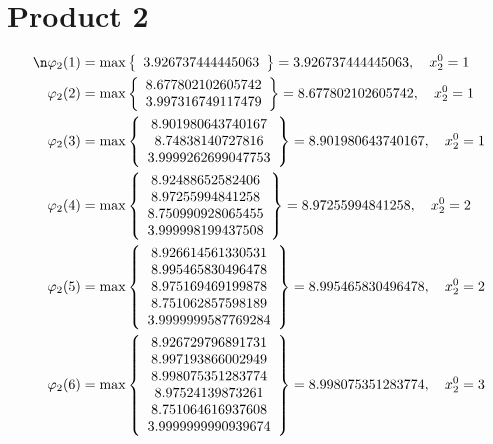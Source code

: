 \documentclass{article}
\begin{document}
\section{Product 2}
\begin{align*}
\n  
  
\varphi_{2}(1) &= \max \left\{ \begin{array}{c}
3.926737444445063
\end{array} \right\} = 3.926737444445063, \quad x_{2}^0 = 1\\
  
  
  
  
\varphi_{2}(2) &= \max \left\{ \begin{array}{c}
8.677802102605742 \\
 3.997316749117479
\end{array} \right\} = 8.677802102605742, \quad x_{2}^0 = 1\\
  
  
  
  
\varphi_{2}(3) &= \max \left\{ \begin{array}{c}
8.901980643740167 \\
 8.74838140727816 \\
 3.9999262699047753
\end{array} \right\} = 8.901980643740167, \quad x_{2}^0 = 1\\
  
  
  
  
\varphi_{2}(4) &= \max \left\{ \begin{array}{c}
8.92488652582406 \\
 8.97255994841258 \\
 8.750990928065455 \\
 3.999998199437508
\end{array} \right\} = 8.97255994841258, \quad x_{2}^0 = 2\\
  
  
  
  
\varphi_{2}(5) &= \max \left\{ \begin{array}{c}
8.926614561330531 \\
 8.995465830496478 \\
 8.975169469199878 \\
 8.751062857598189 \\
 3.9999999587769284
\end{array} \right\} = 8.995465830496478, \quad x_{2}^0 = 2\\
  
  
  
  
\varphi_{2}(6) &= \max \left\{ \begin{array}{c}
8.926729796891731 \\
 8.997193866002949 \\
 8.998075351283774 \\
 8.97524139873261 \\
 8.751064616937608 \\
 3.9999999990939674
\end{array} \right\} = 8.998075351283774, \quad x_{2}^0 = 3\\
  

\end{align*}
\end{document}
